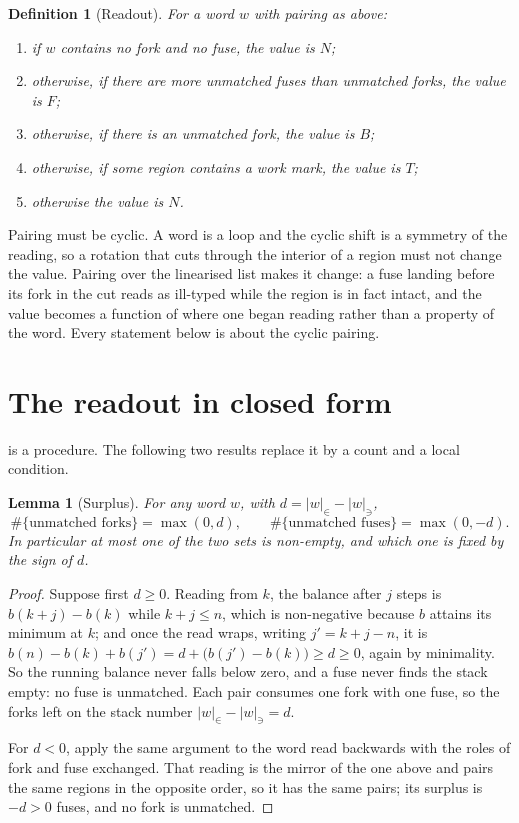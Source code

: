 \documentclass[12pt,a4paper]{article}
\newtheorem{lemma}[theorem]{Lemma}
\newtheorem{definition}[theorem]{Definition}
\begin{document}
\begin{definition}[Readout]
\label{def:readout}
For a word $w$ with pairing as above:
\begin{enumerate}
\item if $w$ contains no fork and no fuse, the value is $N$;
\item otherwise, if there are more unmatched fuses than unmatched forks, the value
      is $F$;
\item otherwise, if there is an unmatched fork, the value is $B$;
\item otherwise, if some region contains a work mark, the value is $T$;
\item otherwise the value is $N$.
\end{enumerate}
\end{definition}

Pairing must be cyclic. A word is a loop and the cyclic shift is a symmetry of the
reading, so a rotation that cuts through the interior of a region must not change
the value. Pairing over the linearised list makes it change: a fuse landing before
its fork in the cut reads as ill-typed while the region is in fact intact, and the
value becomes a function of where one began reading rather than a property of the
word. Every statement below is about the cyclic pairing.

\section{The readout in closed form}

 is a procedure. The following two results replace it by a
count and a local condition.

\begin{lemma}[Surplus]
\label{lem:surplus}
For any word $w$, with $d = |w|_{\in} - |w|_{\ni}$,
\[
  \#\{\text{unmatched forks}\} = \max(0, d),
  \qquad
  \#\{\text{unmatched fuses}\} = \max(0, -d).
\]
In particular at most one of the two sets is non-empty, and which one is fixed by
the sign of $d$.
\end{lemma}

\begin{proof}
Suppose first $d \ge 0$. Reading from $k$, the balance after $j$ steps is
$b(k + j) - b(k)$ while $k + j \le n$, which is non-negative because $b$ attains
its minimum at $k$; and once the read wraps, writing $j' = k + j - n$, it is
$b(n) - b(k) + b(j') = d + \big(b(j') - b(k)\big) \ge d \ge 0$, again by minimality.
So the running balance never falls below zero, and a fuse never finds the stack
empty: no fuse is unmatched. Each pair consumes one fork with one fuse, so the
forks left on the stack number $|w|_{\in} - |w|_{\ni} = d$.

For $d < 0$, apply the same argument to the word read backwards with the roles of
fork and fuse exchanged. That reading is the mirror of the one above and pairs the
same regions in the opposite order, so it has the same pairs; its surplus is
$-d > 0$ fuses, and no fork is unmatched.
\end{proof}
\end{document}
